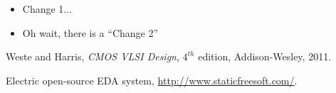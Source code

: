 \documentclass[conference]{IEEEtran}
\begin{document}
\begin{itemize}
\item Change 1... 
\item Oh wait, there is a ``Change 2'' 
\end{itemize}






\begin{thebibliography}{1}

Weste and Harris, \emph{CMOS VLSI Design}, $4^{th}$ edition, Addison-Wesley, 2011.	

Electric open-source EDA system,
\href{http://www.staticfreesoft.com/}{http://www.staticfreesoft.com/}.


\end{thebibliography}

\end{document}
